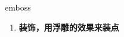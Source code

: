 
\begin{frame}
{\huge emboss}
\begin{center}
\begin{enumerate}\Large
  \item \textbf{装饰，用浮雕的效果来装点}
\end{enumerate}
\end{center}
\end{frame}
